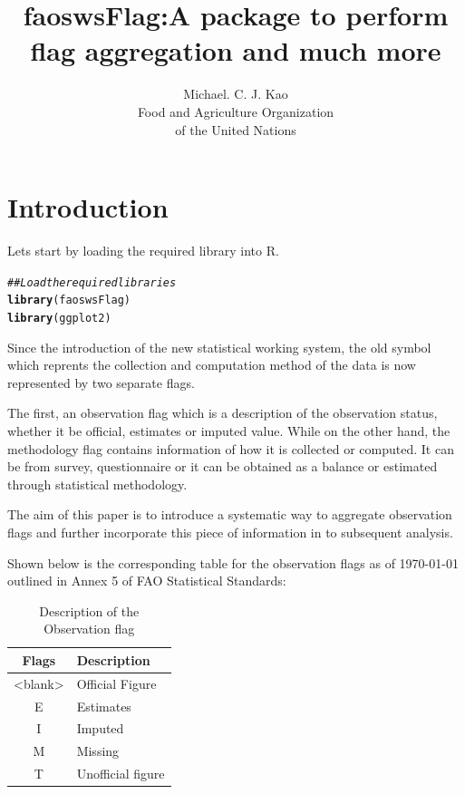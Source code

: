 \documentclass[nojss]{jss}\usepackage[]{graphicx}\usepackage[]{color}
\title{\bf faoswsFlag:A package to perform \\flag aggregation and much
  more}
\author{Michael. C. J. Kao\\ Food and Agriculture Organization \\ of
  the United Nations}
\makeatletter
\newcommand{\hlcom}[1]{\textcolor[rgb]{0.678,0.584,0.686}{\textit{#1}}}%
\newcommand{\hlstd}[1]{\textcolor[rgb]{0.345,0.345,0.345}{#1}}%
\newcommand{\hlkwd}[1]{\textcolor[rgb]{0.737,0.353,0.396}{\textbf{#1}}}%
\newenvironment{kframe}{%
 \def\at@end@of@kframe{}%
 \ifinner\ifhmode%
  \def\at@end@of@kframe{\end{minipage}}%
  \begin{minipage}{\columnwidth}%
 \fi\fi%
 \def\FrameCommand##1{\hskip\@totalleftmargin \hskip-\fboxsep
 \colorbox{shadecolor}{##1}\hskip-\fboxsep
     \hskip-\linewidth \hskip-\@totalleftmargin \hskip\columnwidth}%
 \MakeFramed {\advance\hsize-\width
   \@totalleftmargin\z@ \linewidth\hsize
   \@setminipage}}%
 {\par\unskip\endMakeFramed%
 \at@end@of@kframe}
\newenvironment{knitrout}{}{} %
\makeatother
\begin{document}
\section{Introduction}
Lets start by loading the required library into R.

\begin{knitrout}
\color{fgcolor}\begin{kframe}
\begin{alltt}
\hlcom{## Load the required libraries}
\hlkwd{library}\hlstd{(faoswsFlag)}
\hlkwd{library}\hlstd{(ggplot2)}
\end{alltt}
\end{kframe}
\end{knitrout}

Since the introduction of the new statistical working system, the old
symbol which reprents the collection and computation method of the
data is now represented by two separate flags.

The first, an observation flag which is a description of the
observation status, whether it be official, estimates or imputed
value. While on the other hand, the methodology flag contains
information of how it is collected or computed. It can be from survey,
questionnaire or it can be obtained as a balance or estimated through
statistical methodology.

The aim of this paper is to introduce a systematic way to aggregate
observation flags and further incorporate this piece of information in
to subsequent analysis.

Shown below is the corresponding table for the observation flags as of
\today{} outlined in Annex 5 of FAO Statistical Standards:

\begin{table}[h!]
  \begin{center}
    \caption{Description of the Observation flag}
    \begin{tabular}{|c|p{12cm}|}
      \hline
      Flags & Description\\
      \hline
      <blank> & Official Figure\\
      E & Estimates\\
      I & Imputed\\
      M & Missing\\
      T & Unofficial figure\\
      \hline
    \end{tabular}
  \end{center}  
\end{table}
\end{document}
